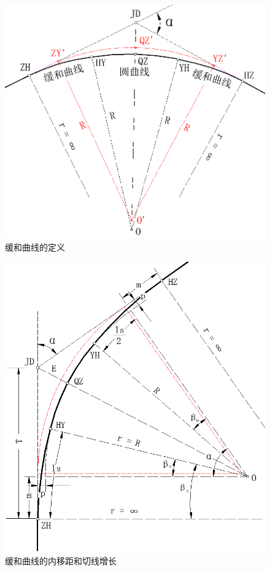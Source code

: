  \begin{figure}[htbp]
    \centering
    \includegraphics[scale=0.6]{route/HY01.png}
    \caption{缓和曲线的定义}
    \label{fig:HR01}
\end{figure}


\begin{figure}[htbp]
    \centering
    \includegraphics[scale=0.6]{route/HY02.png}
    \caption{缓和曲线的内移距和切线增长}
    \label{fig:HY02}
\end{figure}


